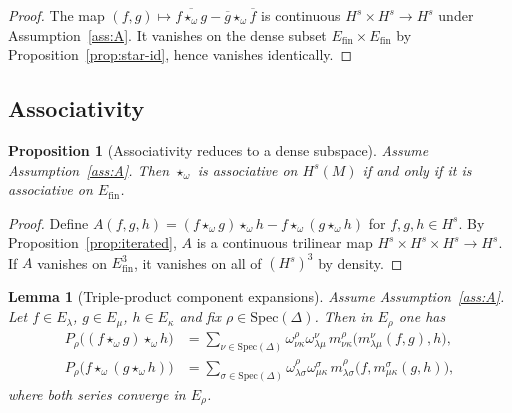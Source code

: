 \documentclass[11pt]{amsart}
\theoremstyle{plain}
\newtheorem{lemma}[theorem]{Lemma}
\newtheorem{proposition}[theorem]{Proposition}
\theoremstyle{definition}
\theoremstyle{remark}
\newcommand{\Spec}{\mathrm{Spec}}
\begin{document}
\begin{proof}
 The map $(f,g)\mapsto \overline{f\star_\omega g}-\overline g\star_\omega\overline f$ is continuous $H^s\times H^s\to H^s$ under Assumption~\ref{ass:A}.
It vanishes on the dense subset $E_{\mathrm{fin}}\times E_{\mathrm{fin}}$ by Proposition~\ref{prop:star-id}, hence vanishes identically.
\end{proof}

\subsection*{Associativity}

\begin{proposition}[Associativity reduces to a dense subspace]\label{prop:dense-assoc}
Assume Assumption~\ref{ass:A}. Then $\star_\omega$ is associative on $H^s(M)$ if and only if it is associative on $E_{\mathrm{fin}}$.
\end{proposition}

\begin{proof}
Define $A(f,g,h)=(f\star_\omega g)\star_\omega h - f\star_\omega(g\star_\omega h)$ for $f,g,h\in H^s$.
By Proposition~\ref{prop:iterated}, $A$ is a continuous trilinear map $H^s\times H^s\times H^s\to H^s$.
If $A$ vanishes on $E_{\mathrm{fin}}^3$, it vanishes on all of $(H^s)^3$ by density.
\end{proof}

\begin{lemma}[Triple-product component expansions]\label{lem:triple}
Assume Assumption~\ref{ass:A}. Let $f\in E_\lambda$, $g\in E_\mu$, $h\in E_\kappa$ and fix $\rho\in\Spec(\Delta)$.
Then in $E_\rho$ one has
\begin{align}\label{eq:left-triple}
P_\rho\big((f\star_\omega g)\star_\omega h\big)
&=\sum_{\nu\in\Spec(\Delta)} \omega^{\rho}_{\nu\kappa}\omega^{\nu}_{\lambda\mu}\, m^{\rho}_{\nu\kappa}\big(m^{\nu}_{\lambda\mu}(f,g),h\big),\\
\label{eq:right-triple}
P_\rho\big(f\star_\omega(g\star_\omega h)\big)
&=\sum_{\sigma\in\Spec(\Delta)} \omega^{\rho}_{\lambda\sigma}\omega^{\sigma}_{\mu\kappa}\, m^{\rho}_{\lambda\sigma}\big(f,m^{\sigma}_{\mu\kappa}(g,h)\big),
\end{align}
where both series converge in $E_\rho$.
\end{lemma}
\end{document}
